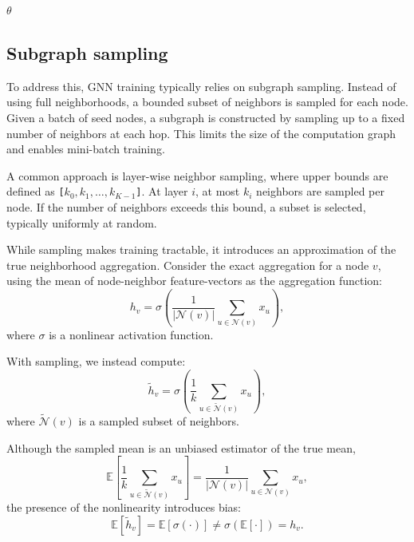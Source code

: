 \documentclass[ oneside,openright,titlepage,numbers=noenddot,headinclude,%
                footinclude=true,cleardoublepage=empty,abstractoff, %
                BCOR=0mm,paper=a4,fontsize=11pt,%
                ngerman,american,%
                ]{scrreprt}
\begin{document}
\begin{algorithm}[H]
\label{algo:sampling}
\footnotesize
\caption{Mini-batch GNN Training (Single Epoch)}
\DontPrintSemicolon
{}
\KwOut{$\theta$}
\Return $\theta$\;
\end{algorithm}


\subsection{Subgraph sampling}

To address this, GNN training typically relies on subgraph sampling. 
Instead of using full neighborhoods, a bounded subset of neighbors is sampled for each node. 
Given a batch of seed nodes, a subgraph is constructed by sampling up to a fixed number of neighbors at each hop. 
This limits the size of the computation graph and enables mini-batch training.

A common approach is layer-wise neighbor sampling, where upper bounds are defined as \texttt{[$k_0, k_1, \ldots, k_{K-1}$]}. 
At layer $i$, at most $k_i$ neighbors are sampled per node. 
If the number of neighbors exceeds this bound, a subset is selected, typically uniformly at random.

While sampling makes training tractable, it introduces an approximation of the true neighborhood aggregation. 
Consider the exact aggregation for a node $v$, using the mean of node-neighbor feature-vectors as the aggregation function:
\[
h_v = \sigma\!\left( \frac{1}{|\mathcal{N}(v)|} \sum_{u \in \mathcal{N}(v)} x_u \right),
\]
where $\sigma$ is a nonlinear activation function.

With sampling, we instead compute:
\[
\tilde{h}_v = \sigma\!\left( \frac{1}{k} \sum_{u \in \tilde{\mathcal{N}}(v)} x_u \right),
\]
where $\tilde{\mathcal{N}}(v)$ is a sampled subset of neighbors.

Although the sampled mean is an unbiased estimator of the true mean,
\[
\mathbb{E}\!\left[ \frac{1}{k} \sum_{u \in \tilde{\mathcal{N}}(v)} x_u \right]
=
\frac{1}{|\mathcal{N}(v)|} \sum_{u \in \mathcal{N}(v)} x_u,
\]
the presence of the nonlinearity introduces bias:
\[
\mathbb{E}[\tilde{h}_v]
=
\mathbb{E}\!\left[\sigma\!\left( \cdot \right)\right]
\neq
\sigma\!\left( \mathbb{E}[\cdot] \right)
=
h_v.
\]
\end{document}
